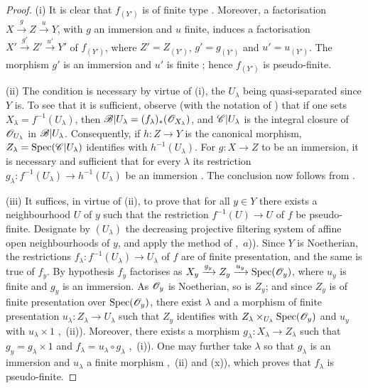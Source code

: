 \begin{proof}
(i) It is clear that $f_{(Y')}$ is of finite type . Moreover, a factorisation $X\xrightarrow{g}Z\xrightarrow{u}Y$, with $g$ an immersion and $u$ finite, induces a factorisation $X'\xrightarrow{g'}Z'\xrightarrow{u'}Y'$ of $f_{(Y')}$, where $Z'=Z_{(Y')}$, $g'=g_{(Y')}$ and $u'=u_{(Y')}$. The morphism $g'$ is an immersion  and $u'$ is finite ; hence $f_{(Y')}$ is pseudo-finite.

(ii) The condition is necessary by virtue of (i), the $U_\lambda$ being quasi-separated since $Y$ is.
To see that it is sufficient, observe (with the notation of ) that if one sets $X_\lambda=f^{-1}(U_\lambda)$, then $\mathscr{B}|U_\lambda=(f_\lambda)_*(\mathscr{O}_{X_\lambda})$, and $\mathscr{C}|U_\lambda$ is the integral closure of $\mathscr{O}_{U_\lambda}$ in $\mathscr{B}|U_\lambda$. Consequently, if $h:Z\to Y$ is the canonical morphism, $Z_\lambda=\operatorname{Spec}(\mathscr{C}|U_\lambda)$ identifies with $h^{-1}(U_\lambda)$. For $g:X\to Z$ to be an immersion, it is necessary and sufficient that for every $\lambda$ its restriction $g_\lambda:f^{-1}(U_\lambda)\to h^{-1}(U_\lambda)$ be an immersion . The conclusion now follows from .

(iii) It suffices, in virtue of (ii), to prove that for all $y\in Y$ there exists a neighbourhood $U$ of $y$ such that the restriction $f^{-1}(U)\to U$ of $f$ be pseudo-finite.
Designate by $(U_\lambda)$ the decreasing projective filtering system of affine open neighbourhoods of $y$, and apply the method of ,~$a$)).
Since $Y$ is Noetherian, the restrictions $f_\lambda:f^{-1}(U_\lambda)\to U_\lambda$ of $f$ are of finite presentation, and the same is true of $f_y$.
By hypothesis $f_y$ factorises as $X_y\xrightarrow{g_y}Z_y\xrightarrow{u_y}\operatorname{Spec}(\mathscr{O}_y)$, where $u_y$ is finite and $g_y$ is an immersion.
As $\mathscr{O}_y$ is Noetherian, so is $Z_y$; and since $Z_y$ is of finite presentation over $\operatorname{Spec}(\mathscr{O}_y)$, there exist $\lambda$ and a morphism of finite presentation $u_\lambda:Z_\lambda\to U_\lambda$ such that $Z_y$ identifies with $Z_\lambda\times_{U_\lambda}\operatorname{Spec}(\mathscr{O}_y)$ and $u_y$ with $u_\lambda\times 1$ ,~(ii)). Moreover, there exists a morphism $g_\lambda:X_\lambda\to Z_\lambda$ such that $g_y=g_\lambda\times 1$ and $f_\lambda=u_\lambda\circ g_\lambda$ ,~(i)). One may further take $\lambda$ so that $g_\lambda$ is an immersion and $u_\lambda$ a finite morphism ,~(ii) and (x)), which proves that $f_\lambda$ is pseudo-finite.
\end{proof}

